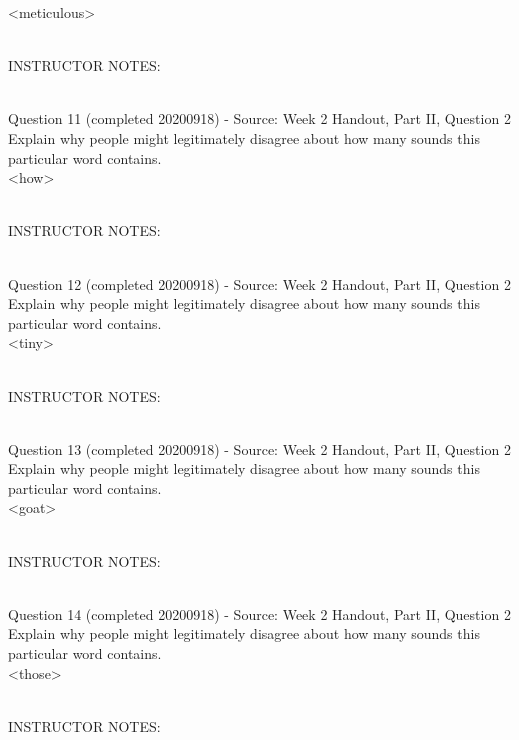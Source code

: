 \documentclass[12pt]{article}
\begin{document}
<meticulous>


~\\
INSTRUCTOR NOTES: 


~\\

{\large Question 11} (completed 20200918) - Source: Week 2 Handout, Part II, Question 2\\

Explain why people might legitimately disagree about how many sounds this particular word contains.\\

<how>


~\\
INSTRUCTOR NOTES: 


~\\

{\large Question 12} (completed 20200918) - Source: Week 2 Handout, Part II, Question 2\\

Explain why people might legitimately disagree about how many sounds this particular word contains.\\

<tiny>


~\\
INSTRUCTOR NOTES: 


~\\

{\large Question 13} (completed 20200918) - Source: Week 2 Handout, Part II, Question 2\\

Explain why people might legitimately disagree about how many sounds this particular word contains.\\

<goat>


~\\
INSTRUCTOR NOTES: 


~\\

{\large Question 14} (completed 20200918) - Source: Week 2 Handout, Part II, Question 2\\

Explain why people might legitimately disagree about how many sounds this particular word contains.\\

<those>


~\\
INSTRUCTOR NOTES: 


~\\
\end{document}
